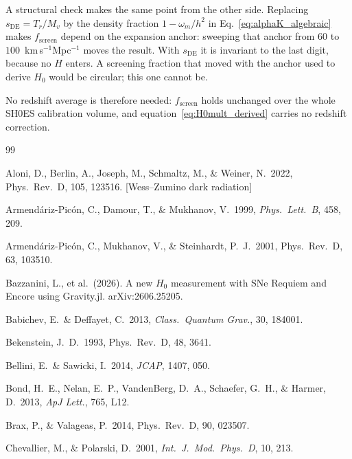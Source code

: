 \documentclass[12pt,a4paper]{article}
\newcommand{\prd}{Phys.\ Rev.\ D}
\newcommand{\fsc}{f_{\mathrm{screen}}}
\newcommand{\sDE}{s_{\mathrm{DE}}} %
\begin{document}
A structural check makes the same point from the other side.  Replacing $\sDE
= T_r/M_v$ by the density fraction $1-\omega_m/h^2$ in
Eq.~\eqref{eq:alphaK_algebraic} makes $\fsc$ depend on the expansion anchor:
sweeping that anchor from $60$ to $100$~km\,s$^{-1}$Mpc$^{-1}$ moves the
result.  With $\sDE$ it is invariant to the last digit, because no $H$ enters.
A screening fraction that moved with the anchor used to derive $H_0$ would be
circular; this one cannot be.

No redshift average is therefore needed: $\fsc$
holds unchanged over the whole SH0ES calibration volume, and
equation~\eqref{eq:H0mult_derived} carries no redshift correction.

\clearpage

\begin{thebibliography}{99}

Aloni, D., Berlin, A., Joseph, M., Schmaltz, M., \& Weiner, N.\ 2022,
\prd, 105, 123516. [Wess--Zumino dark radiation]

Armend\'ariz-Pic\'on, C., Damour, T., \& Mukhanov, V.\ 1999,
\textit{Phys.\ Lett.\ B}, 458, 209.

Armend\'ariz-Pic\'on, C., Mukhanov, V., \& Steinhardt, P.~J.\ 2001,
\prd, 63, 103510.

Bazzanini, L., et al.\ (2026).
A new $H_0$ measurement with SNe Requiem and Encore using Gravity.jl.
arXiv:2606.25205.

Babichev, E.\ \& Deffayet, C.\ 2013, \textit{Class.\ Quantum Grav.}, 30, 184001.

Bekenstein, J.~D.\ 1993, \prd, 48, 3641.

Bellini, E.\ \& Sawicki, I.\ 2014, \textit{JCAP}, 1407, 050.

Bond, H.~E., Nelan, E.~P., VandenBerg, D.~A., Schaefer, G.~H., \&
Harmer, D.\ 2013, \textit{ApJ Lett.}, 765, L12.

Brax, P., \& Valageas, P.\ 2014, \prd, 90, 023507.

Chevallier, M., \& Polarski, D.\ 2001,
\textit{Int.\ J.\ Mod.\ Phys.\ D}, 10, 213.


\end{thebibliography}
\end{document}
